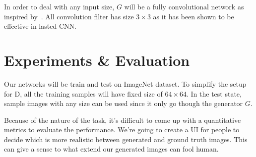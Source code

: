\documentclass[10pt,twocolumn,letterpaper]{article}
\begin{document}
In order to deal with any input size, $G$ will be a fully convolutional network as inspired by~\cite{long2015fully}. All convolution filter has size $3 \times 3$ as it has been shown to be effective in lasted CNN.

\section{Experiments & Evaluation}
Our networks will be train and test on ImageNet dataset. To simplify the setup for D, all the training samples will have fixed size of $64\times 64$. In the test state, sample images with any size can be used since it only go though the generator $G$.

Because of the nature of the task, it's difficult to come up with a quantitative metrics to evaluate the performance. We're going to create a UI for people to decide which is more realistic between generated and ground truth images. This can give a sense to what extend our generated images can fool human.  



{\small


}
\end{document}
